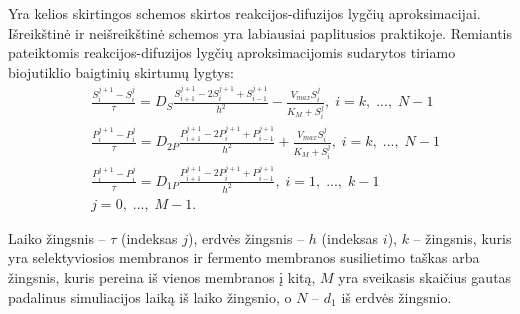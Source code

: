 \documentclass[12pt, a4paper, lithuanian]{article}
\begin{document}
Yra kelios skirtingos schemos skirtos reakcijos-difuzijos lygčių
aproksimacijai. Išreikštinė ir neišreikštinė schemos yra labiausiai paplitusios
praktikoje. Remiantis \cite{baronas2009mathematical} pateiktomis
reakcijos-difuzijos lygčių aproksimacijomis sudarytos tiriamo biojutiklio baigtinių skirtumų lygtys:
\begin{equation}
\begin{aligned} 
    &\frac{S_i^{j+1} - S_i^j}{\tau} = D_S\frac{S_{i+1}^{j+1} -
    2S_i^{j+1} + S_{i-1}^{j+1}}{h^2} -
    \frac{V_{max} S_i^j}{K_M + S_i^j},\;i = k,\;...,\;N-1\\ 
    &\frac{P_i^{j+1} - P_i^j}{\tau} = D_{2P}\frac{P_{i+1}^{j+1} -
    2P_i^{j+1} + P_{i-1}^{j+1}}{h^2} +
    \frac{V_{max} S_i^j}{K_M + S_i^j},\;i = k,\;...,\;N-1\\ 
    &\frac{P_i^{j+1} - P_i^j}{\tau} = D_{1P}\frac{P_{i+1}^{j+1} -
    2P_i^{j+1} + P_{i-1}^{j+1}}{h^2}, \;i = 1,\;...,\;k-1\\ 
    &j=0,\;...,\;M-1.
\end{aligned}
\end{equation}

Laiko žingsnis – $\tau$ (indeksas $j$), erdvės žingsnis – $h$ (indeksas $i$),
$k$ – žingsnis, kuris yra selektyviosios membranos ir fermento membranos
susilietimo taškas arba žingsnis, kuris pereina iš vienos membranos į kitą,
$M$ yra sveikasis skaičius gautas padalinus simuliacijos laiką iš laiko
žingsnio, o $N$ – $d_1$ iš erdvės žingsnio.
% 
% 
% 
% 
\end{document}
